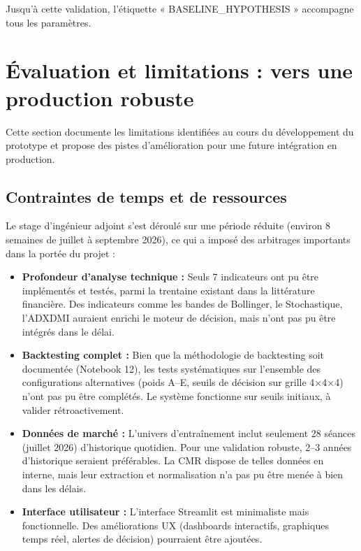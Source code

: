 \documentclass{rapportENSIAS} %
\begin{document}
\noindent
Jusqu'à cette validation, l'étiquette « BASELINE\_HYPOTHESIS » accompagne tous les paramètres.

\section{Évaluation et limitations : vers une production robuste}
\label{sec:limitations}

\noindent
Cette section documente les limitations identifiées au cours du développement du prototype et propose des pistes d'amélioration pour une future intégration en production.

\subsection{Contraintes de temps et de ressources}

\noindent
Le stage d'ingénieur adjoint s'est déroulé sur une période réduite (environ 8 semaines de juillet à septembre 2026), ce qui a imposé des arbitrages importants dans la portée du projet :

\begin{itemize}
    \item \textbf{Profondeur d'analyse technique :} Seuls 7 indicateurs ont pu être implémentés et testés, parmi la trentaine existant dans la littérature financière. Des indicateurs comme les bandes de Bollinger, le Stochastique, l'ADXDMI auraient enrichi le moteur de décision, mais n'ont pas pu être intégrés dans le délai.
    
    \item \textbf{Backtesting complet :} Bien que la méthodologie de backtesting soit documentée (Notebook 12), les tests systématiques sur l'ensemble des configurations alternatives (poids A–E, seuils de décision sur grille 4×4×4) n'ont pas pu être complétés. Le système fonctionne sur seuils initiaux, à valider rétroactivement.
    
    \item \textbf{Données de marché :} L'univers d'entraînement inclut seulement 28 séances (juillet 2026) d'historique quotidien. Pour une validation robuste, 2–3 années d'historique seraient préférables. La CMR dispose de telles données en interne, mais leur extraction et normalisation n'a pas pu être menée à bien dans les délais.
    
    \item \textbf{Interface utilisateur :} L'interface Streamlit est minimaliste mais fonctionnelle. Des améliorations UX (dashboards interactifs, graphiques temps réel, alertes de décision) pourraient être ajoutées.
\end{itemize}
\end{document}
